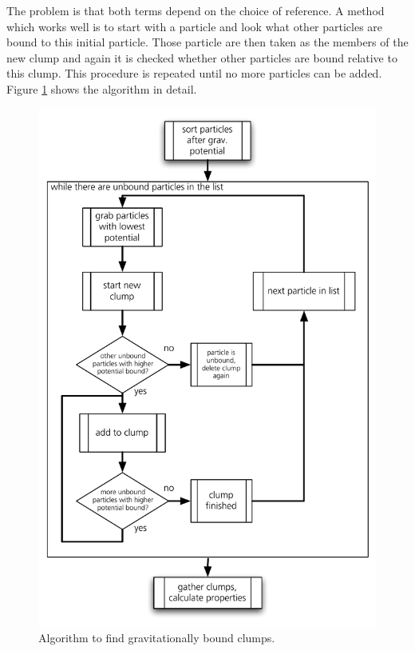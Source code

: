 The problem is that both terms depend on the choice of reference. A method which works well is to start with a particle and look what other particles are bound to this initial particle. Those particle are then taken as the members of the new clump and again it is checked whether other particles are bound relative to this clump. This procedure is repeated until no more particles can be added. Figure \ref{ch02_fig24} shows the algorithm in detail.
\begin{figure}[htbp]
\begin{center}
\includegraphics[scale=0.6]{24algo_fof1.pdf}
\caption{Algorithm to find gravitationally bound clumps.}
\label{ch02_fig24}
\end{center}
\end{figure}

